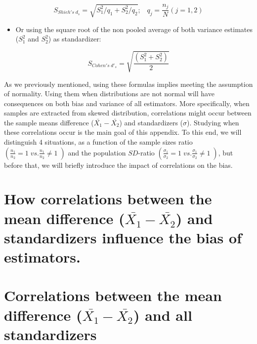 \documentclass[
  man]{apa6}
\providecommand{\tightlist}{%
  \setlength{\itemsep}{0pt}\setlength{\parskip}{0pt}}
\begin{document}
\begin{equation} 
S_{Shieh's \; d_s} = \sqrt{S_1^2/q_1+S_2^2/q_2}; \;\;\; q_j=\frac{n_j}{N} (j=1,2)
\label{eq:Shiehds}
\end{equation}

\begin{itemize}
\tightlist
\item
  Or using the square root of the non pooled average of both variance estimates (\(S^2_1\) and \(S^2_2\)) as standardizer:
\end{itemize}

\begin{equation} 
S_{Cohen's \; d'_s} = \sqrt{\frac{\left(S^2_{1}+S^2_{2} \right)}{2}}
\label{eq:cohenprimeds}
\end{equation}

As we previously mentioned, using these formulas implies meeting the assumption of normality. Using them when distributions are not normal will have consequences on both bias and variance of all estimators. More specifically, when samples are extracted from skewed distribution, correlations might occur between the sample means difference (\(\bar{X_1}-\bar{X_2}\)) and standardizers (\(\sigma\)). Studying when these correlations occur is the main goal of this appendix. To this end, we will distinguish 4 situations, as a function of the sample sizes ratio \(\left( \frac{n_1}{n_2}=1 \; vs. \frac{n_1}{n_2}\neq1\; \right)\) and the population \(SD\)-ratio \(\left( \frac{\sigma_1}{\sigma_2}=1 \; vs. \frac{\sigma_1}{\sigma_2}\neq1\; \right)\), but before that, we will briefly introduce the impact of correlations on the bias.

\hypertarget{how-correlations-between-the-mean-difference-barx_1-barx_2-and-standardizers-influence-the-bias-of-estimators.}{%
\section{\texorpdfstring{How correlations between the mean difference (\(\bar{X_1}-\bar{X_2}\)) and standardizers influence the bias of estimators.}{How correlations between the mean difference (\textbackslash bar\{X\_1\}-\textbackslash bar\{X\_2\}) and standardizers influence the bias of estimators.}}\label{how-correlations-between-the-mean-difference-barx_1-barx_2-and-standardizers-influence-the-bias-of-estimators.}}

\hypertarget{correlations-between-the-mean-difference-barx_1-barx_2-and-all-standardizers}{%
\section{\texorpdfstring{Correlations between the mean difference (\(\bar{X_1}-\bar{X_2}\)) and all standardizers}{Correlations between the mean difference (\textbackslash bar\{X\_1\}-\textbackslash bar\{X\_2\}) and all standardizers}}\label{correlations-between-the-mean-difference-barx_1-barx_2-and-all-standardizers}}
\end{document}
